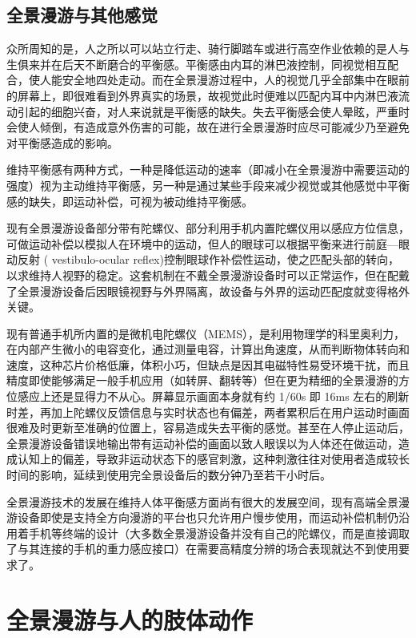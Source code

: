 \subsection{全景漫游与其他感觉}
众所周知的是，人之所以可以站立行走、骑行脚踏车或进行高空作业依赖的是人与生俱来并在后天不断磨合的平衡感。平衡感由内耳的淋巴液控制，同视觉相互配合，使人能安全地四处走动。而在全景漫游过程中，人的视觉几乎全部集中在眼前的屏幕上，即很难看到外界真实的场景，故视觉此时便难以匹配内耳中内淋巴液流动引起的细胞兴奋，对人来说就是平衡感的缺失。失去平衡感会使人晕眩，严重时会使人倾倒，有造成意外伤害的可能，故在进行全景漫游时应尽可能减少乃至避免对平衡感造成的影响。

维持平衡感有两种方式，一种是降低运动的速率（即减小在全景漫游中需要运动的强度）视为主动维持平衡感，另一种是通过某些手段来减少视觉或其他感觉中平衡感的缺失，即运动补偿，可视为被动维持平衡感。

现有全景漫游设备部分带有陀螺仪、部分利用手机内置陀螺仪用以感应方位信息，可做运动补偿以模拟人在环境中的运动，但人的眼球可以根据平衡来进行前庭—眼动反射 ( vestibulo-ocular reflex)控制眼球作补偿性运动，使之匹配头部的转向，以求维持人视野的稳定。这套机制在不戴全景漫游设备时可以正常运作，但在配戴了全景漫游设备后因眼镜视野与外界隔离，故设备与外界的运动匹配度就变得格外关键。

现有普通手机所内置的是微机电陀螺仪（MEMS），是利用物理学的科里奥利力，在内部产生微小的电容变化，通过测量电容，计算出角速度，从而判断物体转向和速度，这种芯片价格低廉，体积小巧，但缺点是因其电磁特性易受环境干扰，而且精度即使能够满足一般手机应用（如转屏、翻转等）但在更为精细的全景漫游的方位感应上还是显得力不从心。屏幕显示画面本身就有约 1/60s 即 16ms 左右的刷新时差，再加上陀螺仪反馈信息与实时状态也有偏差，两者累积后在用户运动时画面很难及时更新至准确的位置上，容易造成失去平衡的感觉。甚至在人停止运动后，全景漫游设备错误地输出带有运动补偿的画面以致人眼误以为人体还在做运动，造成认知上的偏差，导致非运动状态下的感官刺激，这种刺激往往对使用者造成较长时间的影响，延续到使用完全景设备后的数分钟乃至若干小时后。

全景漫游技术的发展在维持人体平衡感方面尚有很大的发展空间，现有高端全景漫游设备即使是支持全方向漫游的平台也只允许用户慢步使用，而运动补偿机制仍沿用着手机等终端的设计（大多数全景漫游设备并没有自己的陀螺仪，而是直接调取了与其连接的手机的重力感应接口）在需要高精度分辨的场合表现就达不到使用要求了。

\section{全景漫游与人的肢体动作}

